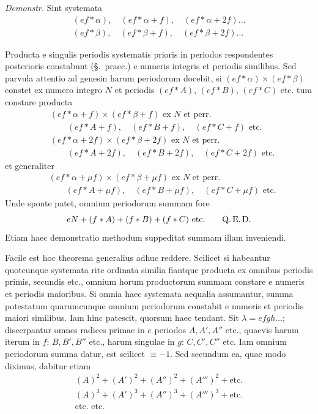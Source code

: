 \emph{Demonstr.} Sint systemata
\[
\begin{gathered}
(ef\ast\alpha),\quad(ef\ast\alpha+f),\quad(ef\ast\alpha+2f)\ldots\\
(ef\ast\beta),\quad(ef\ast\beta+f),\quad(ef\ast\beta+2f)\ldots
\end{gathered}
\]

%
Producta e singulis periodis systematis prioris in periodos respondentes posterioris constabunt (§.\ praec.) e numeris integris et periodis similibus. Sed parvula attentio ad genesin harum periodorum docebit, si $(ef\ast\alpha)\times(ef\ast\beta)$ constet ex numero integro $N$ et periodis $(ef\ast A)$, $(ef\ast B)$, $(ef\ast C)$ etc. tum constare producta
\[
\begin{aligned}
&(ef\ast\alpha+f)\times(ef\ast\beta+f)\text{ ex }N\text{ et perr.}\\
&\hspace{2em}(ef\ast A+f),\quad(ef\ast B+f),\quad(ef\ast C+f)\text{ etc.}\\
&(ef\ast\alpha+2f)\times(ef\ast\beta+2f)\text{ ex }N\text{ et perr.}\\
&\hspace{2em}(ef\ast A+2f),\quad(ef\ast B+2f),\quad(ef\ast C+2f)\text{ etc.}
\end{aligned}
\]
et generaliter
\[
\begin{aligned}
&(ef\ast\alpha+\mu f)\times(ef\ast\beta+\mu f)\text{ ex }N\text{ et perr.}\\
&\hspace{2em}(ef\ast A+\mu f),\quad(ef\ast B+\mu f),\quad(ef\ast C+\mu f)\text{ etc.}
\end{aligned}
\]
Unde sponte patet, omnium periodorum summam fore
\[
eN+(f\ast A)+(f\ast B)+(f\ast C)\text{ etc.}\qquad\text{Q.\,E.\,D.}
\]
Etiam haec demonstratio methodum suppeditat summam illam inveniendi.

Facile est hoc theorema generalius adhuc reddere. Scilicet si habeantur quotcunque systemata rite ordinata similia fiantque producta ex omnibus periodis primis, secundis etc., omnium horum productorum summam constare e numeris et periodis maioribus. Si omnia haec systemata aequalia assumantur, summa potestatum quarumcunque omnium periodorum constabit e numeris et periodis maiori similibus. Iam hinc patescit, quorsum haec tendant. Sit $\lambda=efgh\ldots$; discerpantur omnes radices primae in $e$ periodos $A,A',A''$ etc., quaevis harum iterum in $f$: $B,B',B''$ etc., harum singulae in $g$: $C,C',C''$ etc. Iam omnium periodorum summa datur, est scilicet $\equiv-1$. Sed secundum ea, quae modo diximus, dabitur etiam
\[
\begin{gathered}
(A)^2+(A')^2+(A'')^2+(A''')^2+\text{etc.}\\
(A)^3+(A')^3+(A'')^3+(A''')^3+\text{etc.}\\
\text{etc. etc.}
\end{gathered}
\]

